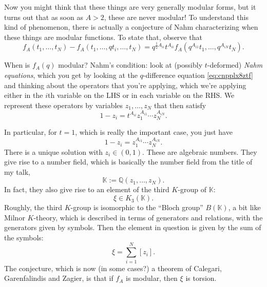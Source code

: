 \documentclass[reqno]{amsart} 
\begin{document}
Now you might think that these things are very generally modular forms, but it turns out that as soon as $A > 2$, these are never modular!  To understand this kind of phenomenon, there is actually a conjecture of Nahm characterizing when these things are modular functions.  To state that, observe that
\begin{equation}\label{eq:cnpplx8ztf}
  f_A(t_1, \dotsc, t_N) - f_A(t_1, \dotsc, q t_i, \dotsc, t_N )
  = q^{\tfrac{1}{2} A_{ii}} t^{A_{ii}}
  f_A(q^{A_{i 1}} t_1, \dotsc,   q^{A_{i N}} t_N).
\end{equation}

\begin{conjecture}
  When is $f_A(q)$ modular?  Nahm's condition: look at (possibly $t$-deformed) \emph{Nahm equations}, which you get by looking at the $q$-difference equation \eqref{eq:cnpplx8ztf} and thinking about the operators that you're applying, which we're applying either in the $i$th variable on the LHS or in each variable on the RHS.  We represent these operators by variables $z_1, \dotsc, z_N$ that then satisfy
  \begin{equation*}
    1 - z_i = t^{A_{i i}} z_1^{A_{i 1}} \dotsb z_N^{A_{i N}}.
  \end{equation*}
\end{conjecture}
In particular, for $t =1$, which is really the important case, you just have
\begin{equation*}
  1 - z_i = z_1^{A_{i 1}} \dotsb z_N^{A_{i N}}.
\end{equation*}
There is a unique solution with $z_i \in(0, 1)$.  These are algebraic numbers.  They give rise to a number field, which is basically the number field from the title of my talk,
\begin{equation*}
  \mathbb{K} := \mathbb{Q}(z_1, \dotsc, z_N).
\end{equation*}
In fact, they also give rise to an element of the third $K$-group of $\mathbb{K}$:
\begin{equation*}
  \xi \in K_3(\mathbb{K}).
\end{equation*}
Roughly, the third $K$-group is isomorphic to the ``Bloch group'' $B(\mathbb{K})$, a bit like Milnor $K$-theory, which is described in terms of generators and relations, with the generators given by symbols.  Then the element in question is given by the sum of the symbols:
\begin{equation*}
  \xi = \sum_{i = 1}^N[z_i].
\end{equation*}
The conjecture, which is now (in some cases?) a theorem of Calegari, Garenfalindis and Zagier, is that if $f_A$ is modular, then $\xi$ is torsion.
\end{document}

